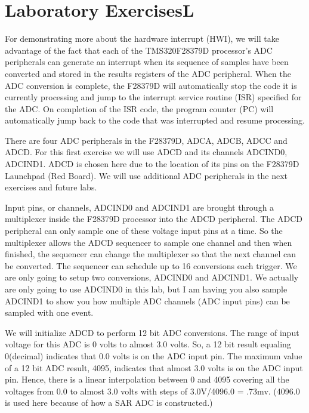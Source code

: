 \documentclass[11pt]{article}
\begin{document}
\section*{Laboratory ExercisesL}


For demonstrating more about the hardware interrupt (HWI), we will take advantage of the fact that each of the TMS320F28379D processor’s ADC peripherals can generate an interrupt when its sequence of samples have been converted and stored in the results registers of the ADC peripheral. When the ADC conversion is complete, the F28379D will automatically stop the code it is currently processing and jump to the interrupt service routine (ISR) specified for the ADC. On completion of the ISR code, the program counter (PC) will automatically jump back to the code that was interrupted and resume processing.

There are four ADC peripherals in the F28379D, ADCA, ADCB, ADCC and ADCD. For this first exercise we will use ADCD and its channels ADCIND0, ADCIND1. ADCD is chosen here due to the location of its pins on the F28379D Launchpad (Red Board). We will use additional ADC peripherals in the next exercises and future labs.

Input pins, or channels, ADCIND0 and ADCIND1 are brought through a multiplexer inside the F28379D processor into the ADCD peripheral. The ADCD peripheral can only sample one of these voltage input pins at a time. So the multiplexer allows the ADCD sequencer to sample one channel and then when finished, the sequencer can change the multiplexer so that the next channel can be converted. The sequencer can schedule up to 16 conversions each trigger. We are only going to setup two conversions, ADCIND0 and ADCIND1. We actually are only going to use ADCIND0 in this lab, but I am having you also sample ADCIND1 to show you how multiple ADC channels (ADC input pins) can be sampled with one event.

We will initialize ADCD to perform 12 bit ADC conversions. The range of input voltage for this ADC is 0 volts to almost 3.0 volts. So, a 12 bit result equaling 0(decimal) indicates that 0.0 volts is on the ADC input pin. The maximum value of a 12 bit ADC result, 4095, indicates that almost 3.0 volts is on the ADC input pin. Hence, there is a linear interpolation between 0 and 4095 covering all the voltages from 0.0 to almost 3.0 volts with steps of 3.0V/4096.0 = .73mv. (4096.0 is used here because of how a SAR ADC is constructed.)
\end{document}
